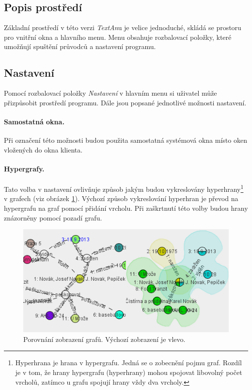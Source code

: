 \documentclass[12pt,a4paper]{report}
\newcommand{\textan}{\emph{TextAn}}
\begin{document}
\subsection{Popis prostředí}
Základní prostředí v této verzi \textan u je velice jednoduché, skládá se prostoru pro vnitřní okna a hlavního menu. Menu obsahuje rozbalovací položky, které umožňují spuštění průvodců a nastavení programu.


\subsection{Nastavení}
\label{sec:Nastaveni}
Pomocí rozbalovací položky \emph{Nastavení} v hlavním menu si uživatel může přizpůsobit prostředí programu. Dále jsou popsané jednotlivé možnosti nastavení.

\paragraph{Samostatná okna.} Při označení této možnosti budou použita samostatná systémová okna místo oken vložených do okna klienta. 

\paragraph{Hypergrafy.} Tato volba v nastavení ovlivňuje způsob jakým budou vykreslovány hyperhrany\footnote{Hyperhrana je hrana v hypergrafu. Jedná se o zobecnění pojmu graf. Rozdíl je v tom, že hrany hypergrafu (hyperhrany) mohou spojovat libovolný počet vrcholů, zatímco u grafu spojují hrany vždy dva vrcholy.} v grafech (viz obrázek \ref{fig:Grafy}). Výchozí způsob vykreslování hyperhran je převod na hypergrafu na graf pomocí přidání vrcholu. Při zaškrtnutí této volby budou hrany znázorněny pomocí pozadí grafu.

\begin{figure}[!htb]
	\centering
	\includegraphics[width=\textwidth]{grafy}
	\caption{Porovnání zobrazení grafů. Výchozí zobrazení je vlevo.}
	\label{fig:Grafy}
\end{figure}
\end{document}
